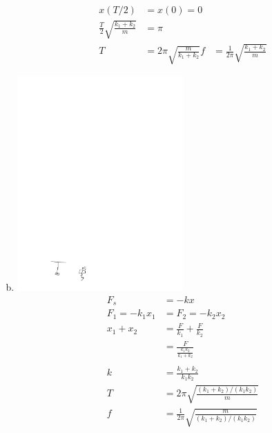 \documentclass{esg8012pset}
\begin{document}
\begin{solution}
\begin{enumerate}[a)]
\begin{align*}
      x(T/2) & = x(0) = 0 \\
      \frac{T}{2}\sqrt{\frac{k_1 + k_2}{m}} & = \pi \\
      T & = 2\pi\sqrt{\frac{m}{k_1 + k_2}} 
      f & = \frac{1}{2\pi}\sqrt{\frac{k_1 + k_2}{m}} 
    \end{align*}
    \item \includegraphics[width=0.5\textwidth]{2009-10-02_Diagram_5_2}\begin{align*}
     F_s & = -kx \\
     F_1 = -k_1 x_1 & = F_2 = -k_2 x_2 \\
     x_1 + x_2 & = \frac{F}{k_1} + \frac{F}{k_2} \\
     & = \frac{F}{\frac{k_1 k_2}{k_1 + k_2}} \\
     \\
     k & = \frac{k_1 + k_2}{k_1 k_2} \\
     T & = 2\pi\sqrt{\frac{(k_1+k_2)/(k_1 k_2)}{m}} \\
     f & = \frac{1}{2\pi}\sqrt{\frac{m}{(k_1+k_2)/(k_1 k_2)}}
   \end{align*}
  \end{enumerate}
\end{solution}
\end{document}
